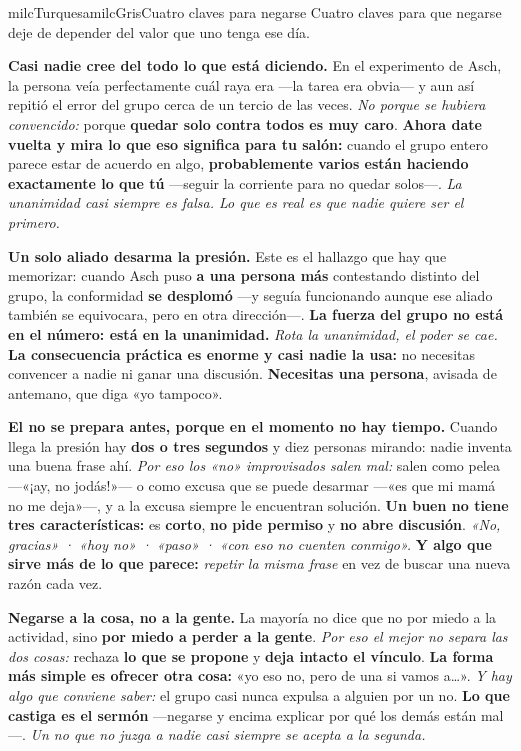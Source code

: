 \documentclass[11pt,letterpaper]{article}
\newcommand{\milcpaso}[3]{%
\Needspace{4\baselineskip}%
\begin{tcolorbox}[enhanced,colback=white,colframe=milcLinea,arc=1.5mm,boxrule=.9pt,
  left=14mm,right=4mm,top=3mm,bottom=3mm,before skip=4pt,after skip=4pt,
  fontupper=\RaggedRight,
  overlay={\node[anchor=north west,circle,fill=#2,text=white,inner sep=0pt,
    minimum size=7.4mm,font=\sffamily\bfseries\small]
    at ([xshift=3.6mm,yshift=-3.2mm]frame.north west) {#1};}]
#3
\end{tcolorbox}}
\begin{document}
\begin{softbox}{milcTurquesa}{milcGris}{Cuatro claves para negarse}
Cuatro claves para que negarse deje de depender del valor que uno tenga ese día.
\end{softbox}

\milcpaso{1}{milcTurquesa}{\textbf{Casi nadie cree del todo lo que está diciendo.} En el experimento de Asch, la persona veía perfectamente cuál raya era ---la tarea era obvia--- y aun así repitió el error del grupo cerca de un tercio de las veces. \emph{No porque se hubiera convencido:} porque \textbf{quedar solo contra todos es muy caro}. \textbf{Ahora date vuelta y mira lo que eso significa para tu salón:} cuando el grupo entero parece estar de acuerdo en algo, \textbf{probablemente varios están haciendo exactamente lo que tú} ---seguir la corriente para no quedar solos---. \emph{La unanimidad casi siempre es falsa. Lo que es real es que nadie quiere ser el primero.}}
\milcpaso{2}{milcTurquesa}{\textbf{Un solo aliado desarma la presión.} Este es el hallazgo que hay que memorizar: cuando Asch puso \textbf{a una persona más} contestando distinto del grupo, la conformidad \textbf{se desplomó} ---y seguía funcionando aunque ese aliado también se equivocara, pero en otra dirección---. \textbf{La fuerza del grupo no está en el número: está en la unanimidad.} \emph{Rota la unanimidad, el poder se cae.} \textbf{La consecuencia práctica es enorme y casi nadie la usa:} no necesitas convencer a nadie ni ganar una discusión. \textbf{Necesitas una persona}, avisada de antemano, que diga «yo tampoco».}
\milcpaso{3}{milcTurquesa}{\textbf{El no se prepara antes, porque en el momento no hay tiempo.} Cuando llega la presión hay \textbf{dos o tres segundos} y diez personas mirando: nadie inventa una buena frase ahí. \emph{Por eso los «no» improvisados salen mal:} salen como pelea ---«¡ay, no jodás!»--- o como excusa que se puede desarmar ---«es que mi mamá no me deja»---, y a la excusa siempre le encuentran solución. \textbf{Un buen no tiene tres características:} es \textbf{corto}, \textbf{no pide permiso} y \textbf{no abre discusión}. \emph{«No, gracias» · «hoy no» · «paso» · «con eso no cuenten conmigo».} \textbf{Y algo que sirve más de lo que parece:} \emph{repetir la misma frase} en vez de buscar una nueva razón cada vez.}
\milcpaso{4}{milcTurquesa}{\textbf{Negarse a la cosa, no a la gente.} La mayoría no dice que no por miedo a la actividad, sino \textbf{por miedo a perder a la gente}. \emph{Por eso el mejor no separa las dos cosas:} rechaza \textbf{lo que se propone} y \textbf{deja intacto el vínculo}. \textbf{La forma más simple es ofrecer otra cosa:} «yo eso no, pero de una si vamos a\ldots». \emph{Y hay algo que conviene saber:} el grupo casi nunca expulsa a alguien por un no. \textbf{Lo que castiga es el sermón} ---negarse y encima explicar por qué los demás están mal---. \emph{Un no que no juzga a nadie casi siempre se acepta a la segunda.}}
\end{document}

